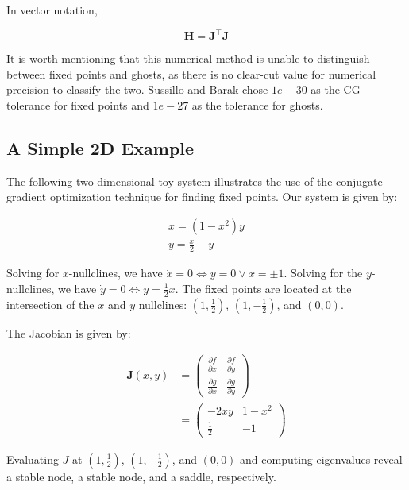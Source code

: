 \documentclass{article} %
\newcommand{\bf}[1]{\mathbf{#1}}
\newcommand{\J}{\bf{J}}
\newcommand{\p}{\partial}
\newcommand{\pf}[2]{\frac{\p{#1}}{\p{#2}}}
\begin{document}
In vector notation,

\begin{equation} \label{eq:Hessian}
  \bf{H} = \J^{\intercal}\J
\end{equation}

It is worth mentioning that this numerical method is unable to distinguish between fixed points and ghosts, as there is no clear-cut value for numerical precision to classify the two. Sussillo and Barak chose $1e-30$ as the CG tolerance for fixed points and $1e-27$ as the tolerance for ghosts.


\subsection{A Simple 2D Example}

The following two-dimensional toy system illustrates the use of the conjugate-gradient optimization technique for finding fixed points. Our system is given by:

\begin{align} %
\dot{x} = (1-x^2)y  \label{eq:simple2d:x}  \\
\dot{y} = \frac{x}{2}-y  \label{eq:simple2d:y}
\end{align}

Solving for $x$-nullclines, we have $\dot{x} = 0 \iff y = 0 \lor x = \pm 1$. Solving for the $y$-nullclines, we have $\dot{y} = 0 \iff y = \frac{1}{2}x$. The fixed points are located at the intersection of the $x$ and $y$ nullclines: $(1,\frac{1}{2})$, $(1,-\frac{1}{2})$, and $(0,0)$.

The Jacobian is given by:

\begin{align}
  \bf{J}(x,y) &= \begin{pmatrix}
    \pf{f}{x} & \pf{f}{y}\\
    \pf{g}{x} & \pf{g}{y}
    \end{pmatrix}
    \\
&= \begin{pmatrix}
    -2xy & 1-x^2\\
    \frac{1}{2} & -1
    \end{pmatrix}
\end{align}

Evaluating $J$ at $(1,\frac{1}{2})$, $(1,-\frac{1}{2})$, and $(0,0)$ and computing eigenvalues reveal a stable node, a stable node, and a saddle, respectively.
\end{document}
